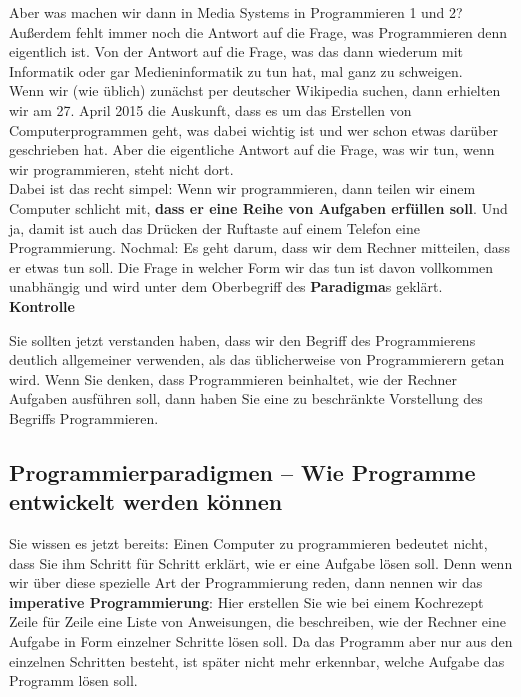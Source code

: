 Aber was machen wir dann in Media Systems in Programmieren 1 und 2? Außerdem fehlt immer noch die Antwort auf die Frage, was Programmieren denn eigentlich ist. Von der Antwort auf die Frage, was das dann wiederum mit Informatik oder gar Medieninformatik zu tun hat, mal ganz zu schweigen.\\

Wenn wir (wie üblich) zunächst per deutscher Wikipedia suchen, dann erhielten wir am 27. April 2015 die Auskunft, dass es um das Erstellen von Computerprogrammen geht, was dabei wichtig ist und wer schon etwas darüber geschrieben hat. Aber die eigentliche Antwort auf die Frage, was wir tun, wenn wir programmieren, steht nicht dort.\\

Dabei ist das recht simpel: Wenn wir programmieren, dann teilen wir einem Computer schlicht mit, \textbf{dass er eine Reihe von Aufgaben erfüllen soll}. Und ja, damit ist auch das Drücken der Ruftaste auf einem Telefon eine Programmierung. Nochmal: Es geht darum, dass wir dem Rechner mitteilen, dass er etwas tun soll. Die Frage in welcher Form wir das tun ist davon vollkommen unabhängig und wird unter dem Oberbegriff des \textbf{Paradigma}s geklärt.\\

\textbf{Kontrolle}

Sie sollten jetzt verstanden haben, dass wir den Begriff des Programmierens deutlich allgemeiner verwenden, als das üblicherweise von Programmierern getan wird. Wenn Sie denken, dass Programmieren beinhaltet, wie der Rechner Aufgaben ausführen soll, dann haben Sie eine zu beschränkte Vorstellung des Begriffs Programmieren.

\subsection[Paradigmen]{Programmierparadigmen – Wie Programme entwickelt werden können}

Sie wissen es jetzt bereits: Einen Computer zu programmieren bedeutet nicht, dass Sie ihm Schritt für Schritt erklärt, wie er eine Aufgabe lösen soll. Denn wenn wir über diese spezielle Art der Programmierung reden, dann nennen wir das \textbf{imperative Programmierung}: Hier erstellen Sie wie bei einem Kochrezept Zeile für Zeile eine Liste von Anweisungen, die beschreiben, wie der Rechner eine Aufgabe in Form einzelner Schritte lösen soll. Da das Programm aber nur aus den einzelnen Schritten besteht, ist später nicht mehr erkennbar, welche Aufgabe das Programm lösen soll.\\

